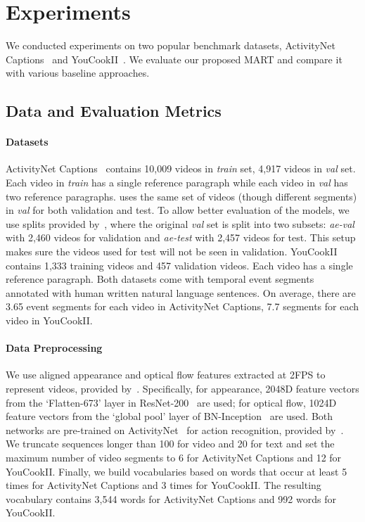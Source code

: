 \documentclass[11pt,a4paper]{article}
\begin{document}
 \section{Experiments}\label{experiments}
We conducted experiments on two popular benchmark datasets, ActivityNet Captions~\cite{krishna2017dense} and YouCookII~\cite{Zhou2017TowardsAL}. 
We evaluate our proposed MART and compare it with various baseline approaches.

\subsection{Data and Evaluation Metrics} \label{subsec:dataset_and_metric}
\paragraph{Datasets} ActivityNet Captions~\cite{krishna2017dense} contains 10,009 videos in \textit{train} set, 4,917 videos in \textit{val} set. 
Each video in \textit{train} has a single reference paragraph while each video in \textit{val} has two reference paragraphs.
\citet{park2019adversarial} uses the same set of videos (though different segments) in \textit{val} for both validation and test.
To allow better evaluation of the models, we use splits provided by~\citet{Zhou2018GroundedVD}, where the original \textit{val} set is split into two subsets: \textit{ae-val} with 2,460 videos for validation and \textit{ae-test} with 2,457 videos for test.
This setup makes sure the videos used for test will not be seen in validation.
YouCookII~\cite{Zhou2017TowardsAL} contains 1,333 training videos and 457 validation videos. Each video has a single reference paragraph.
Both datasets come with temporal event segments annotated with human written natural language sentences. 
On average, there are 3.65 event segments for each video in ActivityNet Captions, 7.7 segments for each video in YouCookII.

\paragraph{Data Preprocessing} We use aligned appearance and optical flow features extracted at 2FPS to represent videos, provided by~\citet{zhou2018end}.
Specifically, for appearance, 2048D feature vectors from the `Flatten-673' layer in ResNet-200~\cite{he2016deep} are used; 
for optical flow, 1024D feature vectors from the `global pool' layer of  BN-Inception~\cite{ioffe2015batch} are used. 
Both networks are pre-trained on ActivityNet~\cite{caba2015activitynet} for action recognition, provided by~\cite{xiong2016cuhk}. 
We truncate sequences longer than 100 for video and 20 for text and set the maximum number of video segments to 6 for ActivityNet Captions and 12 for YouCookII. 
Finally, we build vocabularies based on words that occur at least 5 times for ActivityNet Captions and 3 times for YouCookII. The resulting vocabulary contains 3,544 words for ActivityNet Captions and 992 words for YouCookII.
\end{document}
